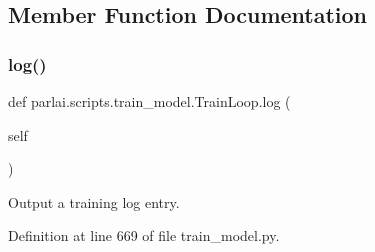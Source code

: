 \subsection{Member Function Documentation}
\mbox{\label{classparlai_1_1scripts_1_1train__model_1_1TrainLoop_a8ef64c11f101d087ceb83d21621b9665}} 
\subsubsection{\texorpdfstring{log()}{log()}}
{\footnotesize\ttfamily def parlai.\+scripts.\+train\+\_\+model.\+Train\+Loop.\+log (\begin{DoxyParamCaption}\item[{}]{self }\end{DoxyParamCaption})}

\begin{DoxyVerb}Output a training log entry.
\end{DoxyVerb}
 

Definition at line 669 of file train\+\_\+model.\+py.


